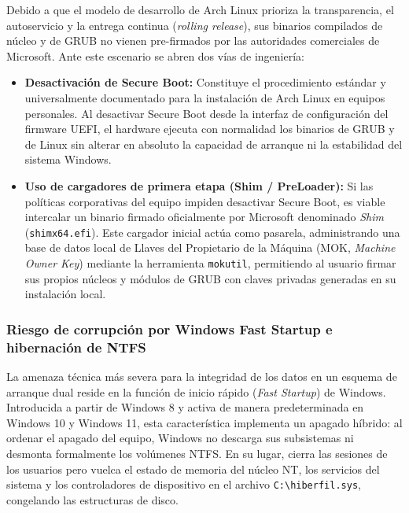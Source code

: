\documentclass[12pt]{article}
\begin{document}
Debido a que el modelo de desarrollo de Arch Linux prioriza la transparencia, el autoservicio y la entrega continua (\textit{rolling release}), sus binarios compilados de núcleo y de GRUB no vienen pre-firmados por las autoridades comerciales de Microsoft. Ante este escenario se abren dos vías de ingeniería:
\begin{itemize}[noitemsep, topsep=2pt]
    \item \textbf{Desactivación de Secure Boot:} Constituye el procedimiento estándar y universalmente documentado para la instalación de Arch Linux en equipos personales. Al desactivar Secure Boot desde la interfaz de configuración del firmware UEFI, el hardware ejecuta con normalidad los binarios de GRUB y de Linux sin alterar en absoluto la capacidad de arranque ni la estabilidad del sistema Windows.
    \item \textbf{Uso de cargadores de primera etapa (Shim / PreLoader):} Si las políticas corporativas del equipo impiden desactivar Secure Boot, es viable intercalar un binario firmado oficialmente por Microsoft denominado \textit{Shim} (\texttt{shimx64.efi}). Este cargador inicial actúa como pasarela, administrando una base de datos local de Llaves del Propietario de la Máquina (MOK, \textit{Machine Owner Key}) mediante la herramienta \texttt{mokutil}, permitiendo al usuario firmar sus propios núcleos y módulos de GRUB con claves privadas generadas en su instalación local.
\end{itemize}

\subsubsection{Riesgo de corrupción por Windows Fast Startup e hibernación de NTFS}

La amenaza técnica más severa para la integridad de los datos en un esquema de arranque dual reside en la función de inicio rápido (\textit{Fast Startup}) de Windows. Introducida a partir de Windows 8 y activa de manera predeterminada en Windows 10 y Windows 11, esta característica implementa un apagado híbrido: al ordenar el apagado del equipo, Windows no descarga sus subsistemas ni desmonta formalmente los volúmenes NTFS. En su lugar, cierra las sesiones de los usuarios pero vuelca el estado de memoria del núcleo NT, los servicios del sistema y los controladores de dispositivo en el archivo \texttt{C:\textbackslash hiberfil.sys}, congelando las estructuras de disco.
\end{document}
